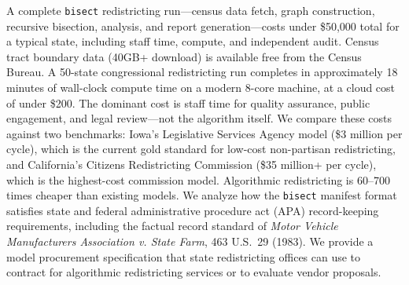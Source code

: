 A complete \texttt{bisect} redistricting run---census data fetch, graph construction, recursive bisection, analysis, and report generation---costs under \$50,000 total for a typical state, including staff time, compute, and independent audit. Census tract boundary data (40GB+ download) is available free from the Census Bureau. A 50-state congressional redistricting run completes in approximately 18 minutes of wall-clock compute time on a modern 8-core machine, at a cloud cost of under \$200. The dominant cost is staff time for quality assurance, public engagement, and legal review---not the algorithm itself. We compare these costs against two benchmarks: Iowa's Legislative Services Agency model (\$3 million per cycle), which is the current gold standard for low-cost non-partisan redistricting, and California's Citizens Redistricting Commission (\$35 million+ per cycle), which is the highest-cost commission model. Algorithmic redistricting is 60--700 times cheaper than existing models. We analyze how the \texttt{bisect} manifest format satisfies state and federal administrative procedure act (APA) record-keeping requirements, including the factual record standard of \textit{Motor Vehicle Manufacturers Association v. State Farm}, 463 U.S.\ 29 (1983). We provide a model procurement specification that state redistricting offices can use to contract for algorithmic redistricting services or to evaluate vendor proposals.
